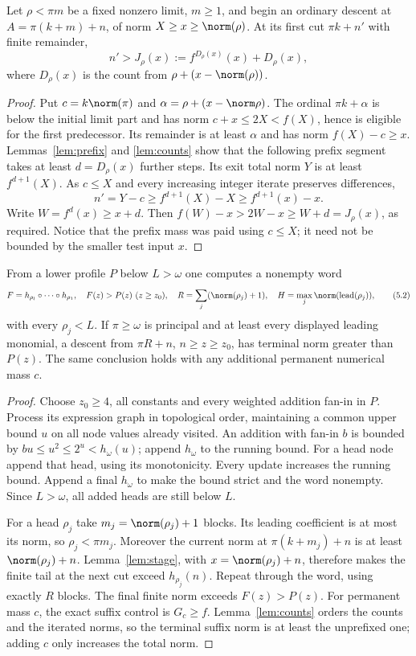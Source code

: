 \documentclass[11pt,a4paper]{article}
\begin{document}
\begin{lemma}\label{lem:stage}
Let $\rho<\pi m$ be a fixed nonzero limit, $m\ge1$, and begin an ordinary
descent at $A=\pi(k+m)+n$, of norm $X\ge x\ge\norm(\rho)$.
At its first cut $\pi k+n'$ with finite remainder,
\[
        n'>J_\rho(x):=f^{D_\rho(x)}(x)+D_\rho(x),    \tag{5.1}
\]
where $D_\rho(x)$ is the count from
$\rho+(x-\norm(\rho))$.
\end{lemma}
\begin{proof}
Put $c=k\norm(\pi)$ and $\alpha=\rho+(x-\norm\rho)$.
The ordinal $\pi k+\alpha$ is below the initial limit part and has norm
$c+x\le2X<f(X)$, hence is eligible for the first predecessor. Its
remainder is at least $\alpha$ and has norm $f(X)-c\ge x$.
Lemmas~\ref{lem:prefix} and \ref{lem:counts} show that the following
prefix segment takes at least $d=D_\rho(x)$ further steps. Its exit total
norm $Y$ is at least $f^{d+1}(X)$. As $c\le X$ and every increasing
integer iterate preserves differences,
\[
 n'=Y-c\ge f^{d+1}(X)-X\ge f^{d+1}(x)-x.
\]
Write $W=f^d(x)\ge x+d$. Then
$f(W)-x>2W-x\ge W+d=J_\rho(x)$, as required.
Notice that the prefix mass was paid using $c\le X$; it need not be
bounded by the smaller test input $x$.
\end{proof}

\begin{lemma}\label{lem:reserve}
From a lower profile $P$ below $L>\omega$ one computes a nonempty word
\[
 F=h_{\rho_l}\circ\cdots\circ h_{\rho_1},\quad
 F(z)>P(z)\ (z\ge z_0),\quad
 R=\sum_j(\norm(\rho_j)+1),\quad
 H=\max_j\norm(\operatorname{lead}(\rho_j)),          \tag{5.2}
\]
with every $\rho_j<L$. If $\pi\ge\omega$ is principal and at least every
displayed leading monomial, a descent from $\pi R+n$, $n\ge z\ge z_0$,
has terminal norm greater than $P(z)$. The same conclusion holds with any
additional permanent numerical mass $c$.
\end{lemma}
\begin{proof}
Choose $z_0\ge4$, all constants and every weighted addition fan-in in $P$.
Process its expression graph in topological order, maintaining a common
upper bound $u$ on all node values already visited. An addition with fan-in
$b$ is bounded by $bu\le u^2\le2^u<h_\omega(u)$; append $h_\omega$ to the
running bound. For a head node append that head, using its monotonicity.
Every update increases the running bound. Append a final $h_\omega$ to
make the bound strict and the word nonempty. Since $L>\omega$, all added
heads are still below $L$.

For a head $\rho_j$ take $m_j=\norm(\rho_j)+1$ blocks. Its leading
coefficient is at most its norm, so $\rho_j<\pi m_j$. Moreover the
current norm at $\pi(k+m_j)+n$ is at least $\norm(\rho_j)+n$.
Lemma~\ref{lem:stage}, with $x=\norm(\rho_j)+n$, therefore makes the
finite tail at the next cut exceed $h_{\rho_j}(n)$. Repeat through the
word, using exactly $R$ blocks. The final finite norm exceeds $F(z)>P(z)$.
For permanent mass $c$, the exact suffix control is $G_c\ge f$.
Lemma~\ref{lem:counts} orders the counts and the iterated norms, so the
terminal suffix norm is at least the unprefixed one; adding $c$ only
increases the total norm.
\end{proof}
\end{document}
